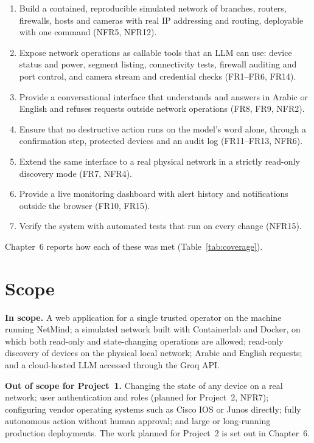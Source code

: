 \begin{enumerate}[label=\textbf{O\arabic*.},leftmargin=2.6em,itemsep=2pt]
  \item Build a contained, reproducible simulated network of branches,
  routers, firewalls, hosts and cameras with real IP addressing and routing,
  deployable with one command (NFR5, NFR12).
  \item Expose network operations as callable tools that an LLM can use:
  device status and power, segment listing, connectivity tests, firewall
  auditing and port control, and camera stream and credential checks
  (FR1--FR6, FR14).
  \item Provide a conversational interface that understands and answers in
  Arabic or English and refuses requests outside network operations
  (FR8, FR9, NFR2).
  \item Ensure that no destructive action runs on the model's word alone,
  through a confirmation step, protected devices and an audit log
  (FR11--FR13, NFR6).
  \item Extend the same interface to a real physical network in a strictly
  read-only discovery mode (FR7, NFR4).
  \item Provide a live monitoring dashboard with alert history and
  notifications outside the browser (FR10, FR15).
  \item Verify the system with automated tests that run on every change
  (NFR15).
\end{enumerate}

Chapter~6 reports how each of these was met (Table~\ref{tab:coverage}).

\section{Scope}

\textbf{In scope.} A web application for a single trusted operator on the
machine running NetMind; a simulated network built with Containerlab and
Docker, on which both read-only and state-changing operations are allowed;
read-only discovery of devices on the physical local network; Arabic and
English requests; and a cloud-hosted LLM accessed through the Groq API.

\textbf{Out of scope for Project~1.} Changing the state of any device on a
real network; user authentication and roles (planned for Project~2, NFR7);
configuring vendor operating systems such as Cisco IOS or Junos directly;
fully autonomous action without human approval; and large or
long-running production deployments. The work planned for Project~2 is set
out in Chapter~6.

